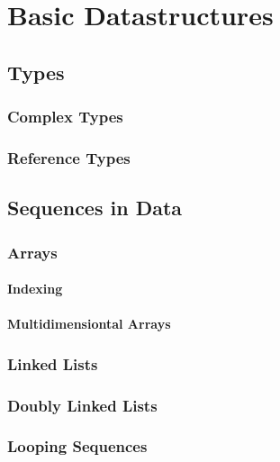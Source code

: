 \chapter{Basic Datastructures}


\section{Types}

\subsection{Complex Types}

\subsection{Reference Types}

\section{Sequences in Data}

\subsection{Arrays}

\subsubsection{Indexing}


\subsubsection{Multidimensiontal Arrays}

\subsection{Linked Lists}


\subsection{Doubly Linked Lists}

\subsection{Looping Sequences}

